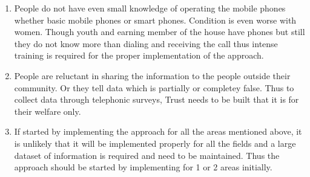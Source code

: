 \begin {enumerate}
\item  People do not have even small knowledge of operating the mobile phones
whether basic mobile phones or smart phones. Condition is even worse with
women. Though youth and earning member of the house have phones but
still they do not know more than dialing and receiving the call thus intense
training is required for the proper implementation of the approach.
\item  People are reluctant in sharing the information to the people outside their
community. Or they tell data which is partially or completey false. Thus to
collect data through telephonic surveys, Trust needs to be built that it is for
their welfare only.
\item If started by implementing the approach for all the areas mentioned above, it
is unlikely that it will be implemented properly for all the fields and a large
dataset of information is required and need to be maintained. Thus the
approach should be started by implementing for 1 or 2 areas initially.
\end {enumerate}

